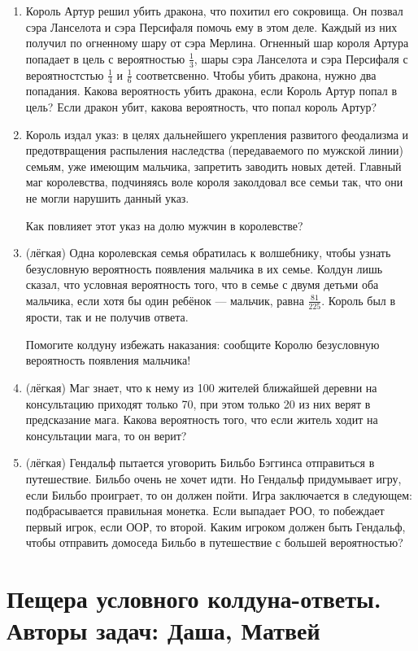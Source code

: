 \documentclass[a4paper,12pt]{article}
\begin{document}
\begin{enumerate} %
\item Король Артур решил убить дракона, что похитил его сокровища. Он позвал сэра Ланселота и сэра Персифаля помочь ему в этом деле. Каждый из них получил по огненному шару от сэра Мерлина. Огненный шар короля Артура попадает в цель с вероятностью $\frac{1}{3} $, шары сэра Ланселота и сэра Персифаля  с вероятностстью $\frac{1}{4}$ и $\frac{1}{6}$ соответсвенно. Чтобы убить дракона, нужно два попадания. Какова вероятность убить дракона, если Король Артур попал в цель? Если дракон убит, какова вероятность, что попал король Артур?

\item Король издал указ: в целях дальнейшего укрепления развитого феодализма и предотвращения распыления наследства (передаваемого по мужской линии) семьям, уже имеющим мальчика, запретить заводить новых детей. Главный маг королевства, подчиняясь воле короля заколдовал все семьи так, что они не могли нарушить данный указ.

Как повлияет этот указ на долю мужчин в королевстве?

\item (лёгкая)
Одна королевская семья обратилась к волшебнику, чтобы узнать безусловную вероятность появления мальчика в их семье. Колдун лишь сказал, что условная вероятность того, что в семье с двумя детьми оба мальчика, если хотя бы один ребёнок — мальчик, равна $\frac{81}{225}$. Король был в ярости, так и не получив ответа.

Помогите колдуну избежать наказания: сообщите Королю безусловную вероятность появления мальчика!

\item (лёгкая) Маг знает, что к нему из 100 жителей ближайшей деревни на консультацию приходят только 70, при этом только 20 из них верят в предсказание мага. Какова вероятность того, что если житель ходит на консультации мага, то он верит?
\item (лёгкая)
 Гендальф пытается уговорить Бильбо Бэггинса отправиться в путешествие. Бильбо очень не хочет идти. Но Гендальф придумывает игру, если Бильбо проиграет, то он должен пойти. Игра заключается в следующем: подбрасывается правильная монетка. Если выпадает РОО, то побеждает первый игрок, если ООР, то второй. Каким игроком должен быть Гендальф, чтобы отправить домоседа Бильбо в путешествие с большей вероятностью?
\end{enumerate}
\newpage
\section{Пещера условного колдуна-ответы. Авторы задач: Даша, Матвей}
\end{document}
